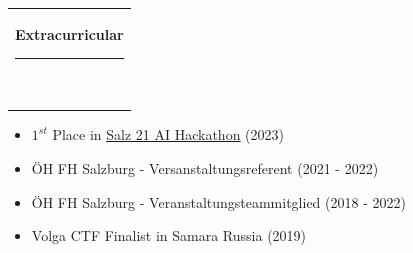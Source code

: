 \documentclass[10pt,A4]{article}
\newcommand{\mpwidth}{\linewidth-\fboxsep-\fboxsep}
\newcommand{\cvtext}[1] {
	\begin{tabular*}{1\mpwidth}{p{0.98\mpwidth}}
		\parbox{1\mpwidth}{#1}
	\end{tabular*}
}
\newcommand{\cvsection}[1] {
	\vspace{14pt}
	\cvtext{
		\textbf{\LARGE{\textcolor{darkcol}{#1}}}\\[-4pt]
		\textcolor{maincol}{ \rule{0.1\textwidth}{2pt} } \\
	}
}
\begin{document}
\begin{paracol}{2}
\begin{rightcolumn}
		\vfill\null
		\cvsection{Extracurricular}
		\vspace{-0.3cm}
		\begin{itemize}
			\item $1^{st}$ Place in \href{https://www.fh-salzburg.ac.at/en/about-fh-salzburg/news-and-events/news?tx_news_pi1%5Baction%5D=detail&tx_news_pi1%5Bcontroller%5D=News&tx_news_pi1%5Bnews%5D=4120&cHash=62d1ec8864492e7b9b17af9e60e6c6c3}{\underline{Salz 21 AI Hackathon}} (2023)
			\item ÖH FH Salzburg - Versanstaltungsreferent (2021 - 2022)
			\item ÖH FH Salzburg - Veranstaltungsteammitglied (2018 - 2022)
			\item Volga CTF Finalist in Samara Russia (2019)
		\end{itemize}
		\vfill\null


		\vfill
		\vfill
		\vfill
	\end{rightcolumn}
\end{paracol}
\end{document}
